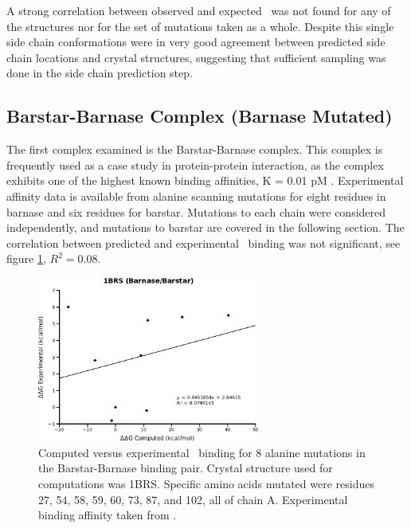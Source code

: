 A strong correlation between observed and expected \ddg\ was not found for any of the structures nor for the set of mutations taken as a whole.
Despite this single side chain conformations were in very good agreement between predicted side chain locations and crystal structures, suggesting that sufficient sampling was done in the side chain prediction step.

\FloatBarrier
\subsection{Barstar-Barnase Complex (Barnase Mutated)}
The first complex examined is the Barstar-Barnase complex.
This complex is frequently used as a case study in protein-protein interaction, as the complex exhibits one of the highest known binding affinities, K = 0.01 pM \cite{hartley1988barnase,hartley1989barnase,schreiber1993interaction}.
Experimental affinity data is available from alanine scanning mutations for eight residues in barnase and six residues for barstar.
Mutations to each chain were considered independently, and mutations to barstar are covered in the following section.
The correlation between predicted and experimental \ddg\ binding was not significant, see figure \ref{figure:computational_mutation_scanning/1BRSa_ddg}, $R^{2}=0.08$.

\begin{figure}[h]
    \centering
    \includegraphics[width=0.65\textwidth]{figures/1brs_barnase_barstar.png}
    \caption{Computed versus experimental \ddg\ binding for 8 alanine mutations in the Barstar-Barnase binding pair.
    Crystal structure used for computations was 1BRS.
    Specific amino acids mutated were residues 27, 54, 58, 59, 60, 73, 87, and 102, all of chain A.
    Experimental binding affinity taken from \protect\cite{thorn2001asedb}.}
    \label{figure:computational_mutation_scanning/1BRSa_ddg}
\end{figure}

